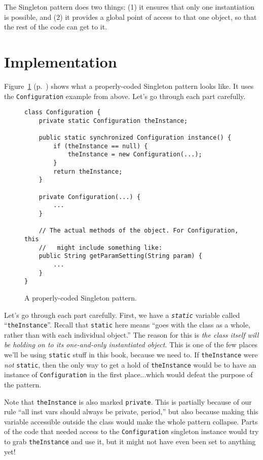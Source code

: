 The Singleton pattern does two things: (1) it ensures that only one
instantiation is possible, and (2) it provides a global point of access to
that one object, so that the rest of the code can get to it.

\section{Implementation}

Figure~\ref{fig:singletonCode} (p.~\pageref{fig:singletonCode}) shows what a
properly-coded Singleton pattern looks like. It uses the \texttt{Configuration}
example from above. Let's go through each part carefully.

\begin{figure}[ht]
\centering
\begin{Verbatim}[fontsize=\footnotesize,samepage=true,frame=single]
class Configuration {
    private static Configuration theInstance;
    
    public static synchronized Configuration instance() {
        if (theInstance == null) {
            theInstance = new Configuration(...);
        }
        return theInstance;
    }

    private Configuration(...) {
        ...
    }

    // The actual methods of the object. For Configuration, this
    //   might include something like:
    public String getParamSetting(String param) {
        ...
    }
}
\end{Verbatim}
\caption{A properly-coded Singleton pattern.}
\label{fig:singletonCode}
\end{figure}


Let's go through each part carefully. First, we have a
\textit{\texttt{static}} variable called ``\texttt{theInstance}''. Recall that
\texttt{static} here means ``goes with the class as a whole, rather than with
each individual object.'' The reason for this is \textit{the class itself will
be holding on to its one-and-only instantiated object.} This is one of the few
places we'll be using \texttt{static} stuff in this book, because we need to.
If \texttt{theInstance} were \textit{not} \texttt{static}, then the only way
to get a hold of \texttt{theInstance} would be to have an instance of
\texttt{Configuration} in the first place...which would defeat the purpose of
the pattern.

Note that \texttt{theInstance} is also marked \texttt{private}. This is
partially because of our rule ``all inst vars should always be private,
period,'' but also because making this variable accessible outside the class
would make the whole pattern collapse. Parts of the code that needed access to
the \texttt{Configuration} singleton instance would try to grab
\texttt{theInstance} and use it, but it might not have even been set to
anything yet!

